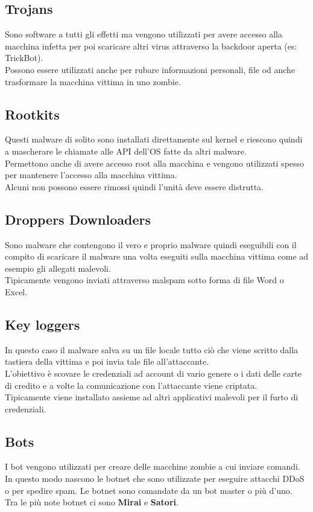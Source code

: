 \subsection{Trojans}
Sono software a tutti gli effetti ma vengono utilizzati per avere accesso alla macchina infetta per poi scaricare altri virus attraverso la backdoor aperta (es: TrickBot).\\
Possono essere utilizzati anche per rubare informazioni personali, file od anche trasformare la macchina vittima in uno zombie.

\subsection{Rootkits}
Questi malware di solito sono installati direttamente sul kernel e riescono quindi a mascherare le chiamate alle \acrshort{API} dell'\acrshort{OS} fatte da altri malware.\\
Permettono anche di avere accesso root alla macchina e vengono utilizzati spesso per mantenere l'accesso alla macchina vittima.\\
Alcuni non possono essere rimossi quindi l'unità deve essere distrutta.

\subsection{Droppers Downloaders}
Sono malware che contengono il vero e proprio malware quindi eseguibili con il compito di scaricare il malware una volta eseguiti sulla macchina vittima come ad esempio gli allegati malevoli.\\
Tipicamente vengono inviati attraverso malspam sotto forma di file Word o Excel.

\subsection{Key loggers}
In questo caso il malware salva su un file locale tutto ciò che viene scritto dalla tastiera della vittima e poi invia tale file all'attaccante.\\
L'obiettivo è scovare le credenziali ad account di vario genere o i dati delle carte di credito e a volte la comunicazione con l'attaccante viene criptata.\\
Tipicamente viene installato assieme ad altri applicativi malevoli per il furto di credenziali.

\subsection{Bots}
I bot vengono utilizzati per creare delle macchine zombie a cui inviare comandi.\\
In questo modo nascono le botnet che sono utilizzate per eseguire attacchi \acrshort{DDoS} o per spedire spam.
Le botnet sono comandate da un bot master o più d'uno.\\
Tra le più note botnet ci sono \textbf{Mirai} e \textbf{Satori}.

